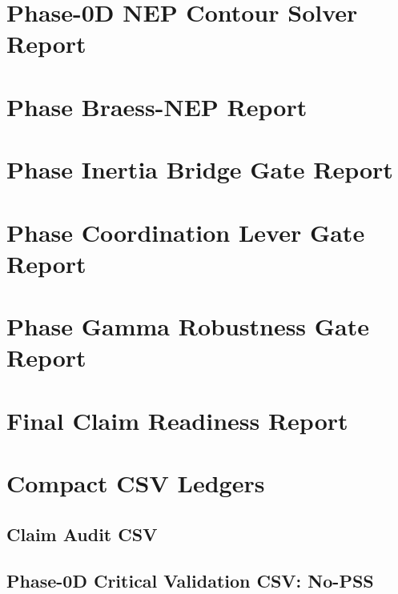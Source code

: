 \documentclass[11pt]{article}
\begin{document}
\section{Phase-0D NEP Contour Solver Report}


\section{Phase Braess-NEP Report}


\section{Phase Inertia Bridge Gate Report}


\section{Phase Coordination Lever Gate Report}


\section{Phase Gamma Robustness Gate Report}


\section{Final Claim Readiness Report}


\clearpage
\section{Compact CSV Ledgers}

\subsection{Claim Audit CSV}


\subsection{Phase-0D Critical Validation CSV: No-PSS}

\end{document}
